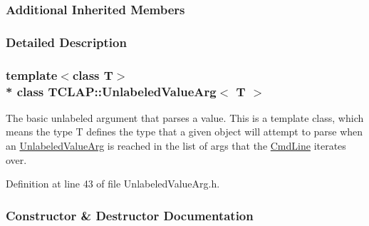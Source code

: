 \subsubsection*{Additional Inherited Members}


\subsubsection{Detailed Description}
\subsubsection*{template$<$class T$>$\\*
class T\+C\+L\+A\+P\+::\+Unlabeled\+Value\+Arg$<$ T $>$}

The basic unlabeled argument that parses a value. This is a template class, which means the type T defines the type that a given object will attempt to parse when an \hyperlink{classTCLAP_1_1UnlabeledValueArg}{Unlabeled\+Value\+Arg} is reached in the list of args that the \hyperlink{classTCLAP_1_1CmdLine}{Cmd\+Line} iterates over. 

Definition at line 43 of file Unlabeled\+Value\+Arg.\+h.



\subsubsection{Constructor \& Destructor Documentation}
